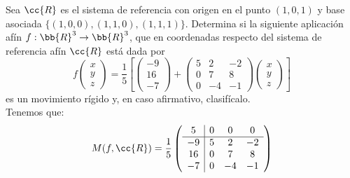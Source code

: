 \begin{ejercicio}
    Sea $\cc{R}$ es el sistema de referencia con origen en el punto $(1, 0, 1)$ y base asociada $\{(1, 0, 0),(1, 1, 0),(1, 1, 1)\}$. Determina si la siguiente aplicación afín $f : \bb{R}^3\to \bb{R}^3$, que en coordenadas respecto del sistema de referencia afín $\cc{R}$ está dada por
    \begin{equation*}
        f\left(\begin{array}{c}
            x \\ y \\ z
        \end{array}\right) = \frac{1}{5}
        \left[
        \left(\begin{array}{c}
            -9 \\ 16 \\ -7
        \end{array}\right) +
        \left(\begin{array}{ccc}
            5 & 2 & -2 \\
            0 & 7 & 8 \\
            0 & -4 & -1
        \end{array}\right)
        \left(\begin{array}{c}
            x \\ y \\ z
        \end{array}\right)
        \right]
    \end{equation*}
    es un movimiento rígido y, en caso afirmativo, clasifícalo.\\

    Tenemos que:
    \begin{equation*}
        M(f, \cc{R}) = \frac{1}{5}\left(
        \begin{array}{c|ccc}
            5 & 0 & 0 & 0 \\ \hline
            -9 & 5 & 2 & -2 \\
            16 & 0 & 7 & 8 \\
            -7 & 0 & -4 & -1
        \end{array}
        \right)
    \end{equation*}


\end{ejercicio}
